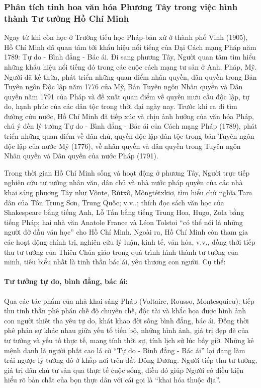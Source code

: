 \subsubsection{Phân tích tinh hoa văn hóa Phương Tây trong việc hình thành Tư tưởng Hồ Chí Minh}

Ngay từ khi còn học ở Trường tiểu học Pháp-bản xứ ở thành phố Vinh (1905), Hồ Chí Minh đã quan tâm tới khẩu hiệu nổi tiếng của Đại Cách mạng Pháp năm 1789: Tự do - Bình đẳng - Bác ái. Đi sang phương Tây, Người quan tâm tìm hiểu những khẩu hiệu nổi tiếng đó trong các cuộc cách mạng tư sản ở Anh, Pháp, Mỹ. Người đã kế thừa, phát triển những quan điểm nhân quyền, dân quyền trong Bản Tuyên ngôn Độc lập năm 1776 của Mỹ, Bản Tuyên ngôn Nhân quyền và Dân quyền năm 1791 của Pháp và đề xuất quan điểm về quyền mưu cầu độc lập, tự do, hạnh phúc của các dân tộc trong thời đại ngày nay. Trước khi ra đi tìm đường cứu nước, Hồ Chí Minh đã tiếp xúc và chịu ảnh hưởng của văn hóa Pháp, chú ý đến lý tưởng Tự do - Bình đẳng - Bác ái của Cách mạng Pháp (1789), phát triển những quan điểm về dân chủ, quyền độc lập dân tộc trong bản Tuyên ngôn độc lập của nước Mỹ (1776), về nhân quyền và dân quyền trong Tuyên ngôn Nhân quyền và Dân quyền của nước Pháp (1791).

Trong thời gian Hồ Chí Minh sống và hoạt động ở phương Tây, Người trực tiếp nghiên cứu tư tưởng nhân văn, dân chủ và nhà nước pháp quyền của các nhà khai sáng phương Tây như Vônte, Rútxô, Môngtétxkiơ, tìm hiểu chủ nghĩa Tam dân của Tôn Trung Sơn, Trung Quốc; v.v..; thích đọc sách văn học của Shakespeare bằng tiếng Anh, Lỗ Tấn bằng tiếng Trung Hoa, Hugo, Zola bằng tiếng Pháp; hai nhà văn Anatole France và Léon Tolstoi ``có thể nói là những người đỡ đầu văn học'' cho Hồ Chí Minh. Ngoài ra, Hồ Chí Minh còn tham gia các hoạt động chính trị, nghiên cứu lý luận, kinh tế, văn hóa, v.v., đồng thời tiếp thu tư tưởng của Thiên Chúa giáo trong quá trình hình thành tư tưởng của minh, tiêu biểu nhất là tinh thần bác ái, yêu thương con người. Cụ thể:

\paragraph{Tư tưởng tự do, bình đẳng, bác ái:}
Qua các tác phẩm của nhà khai sáng Pháp (Voltaire, Rousso, Montesquieu): tiếp thu tinh thần phê phán chế độ chuyên chế, độc tài và khắc họa được hình ảnh con người thiết tha yêu tự do, khát khao đời sống bình đẳng, bác ái. Đồng thời phê phán sự khác nhau giữa yếu tố tiến bộ, những hình ảnh, giá trị đẹp đẽ của tư tưởng và yếu tố thực tế, mang tính thời sự, tính lịch sử lúc bấy giờ. Những kẻ mệnh danh là người phất cao lá cờ ``Tự do - Bình đẳng - Bác ái'' lại đang làm trái ngược lý tưởng đó ở khắp nơi trên đất Đông Dương. Người tiếp thu tư tưởng, giá trị dân chủ tư sản qua thực tế cuộc sống, điều đó giúp Người có điều kiện hiểu rõ bản chất của bọn thực dân với cái gọi là ``khai hóa thuộc địa''.

